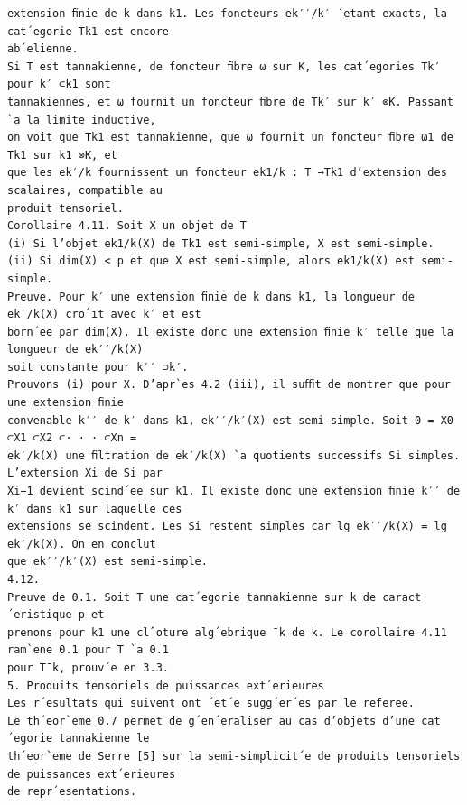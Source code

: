 \documentclass[10pt]{article}
\begin{document}
\begin{verbatim}
extension ﬁnie de k dans k1. Les foncteurs ek′′/k′ ´etant exacts, la cat´egorie Tk1 est encore
ab´elienne.
Si T est tannakienne, de foncteur ﬁbre ω sur K, les cat´egories Tk′ pour k′ ⊂k1 sont
tannakiennes, et ω fournit un foncteur ﬁbre de Tk′ sur k′ ⊗K. Passant `a la limite inductive,
on voit que Tk1 est tannakienne, que ω fournit un foncteur ﬁbre ω1 de Tk1 sur k1 ⊗K, et
que les ek′/k fournissent un foncteur ek1/k : T →Tk1 d’extension des scalaires, compatible au
produit tensoriel.
Corollaire 4.11. Soit X un objet de T
(i) Si l’objet ek1/k(X) de Tk1 est semi-simple, X est semi-simple.
(ii) Si dim(X) < p et que X est semi-simple, alors ek1/k(X) est semi-simple.
Preuve. Pour k′ une extension ﬁnie de k dans k1, la longueur de ek′/k(X) croˆıt avec k′ et est
born´ee par dim(X). Il existe donc une extension ﬁnie k′ telle que la longueur de ek′′/k(X)
soit constante pour k′′ ⊃k′.
Prouvons (i) pour X. D’apr`es 4.2 (iii), il suﬃt de montrer que pour une extension ﬁnie
convenable k′′ de k′ dans k1, ek′′/k′(X) est semi-simple. Soit 0 = X0 ⊂X1 ⊂X2 ⊂· · · ⊂Xn =
ek′/k(X) une ﬁltration de ek′/k(X) `a quotients successifs Si simples. L’extension Xi de Si par
Xi−1 devient scind´ee sur k1. Il existe donc une extension ﬁnie k′′ de k′ dans k1 sur laquelle ces
extensions se scindent. Les Si restent simples car lg ek′′/k(X) = lg ek′/k(X). On en conclut
que ek′′/k′(X) est semi-simple.
4.12.
Preuve de 0.1. Soit T une cat´egorie tannakienne sur k de caract´eristique p et
prenons pour k1 une clˆoture alg´ebrique ¯k de k. Le corollaire 4.11 ram`ene 0.1 pour T `a 0.1
pour T¯k, prouv´e en 3.3.
5. Produits tensoriels de puissances ext´erieures
Les r´esultats qui suivent ont ´et´e sugg´er´es par le referee.
Le th´eor`eme 0.7 permet de g´en´eraliser au cas d’objets d’une cat´egorie tannakienne le
th´eor`eme de Serre [5] sur la semi-simplicit´e de produits tensoriels de puissances ext´erieures
de repr´esentations.


\end{verbatim}
\end{document}

